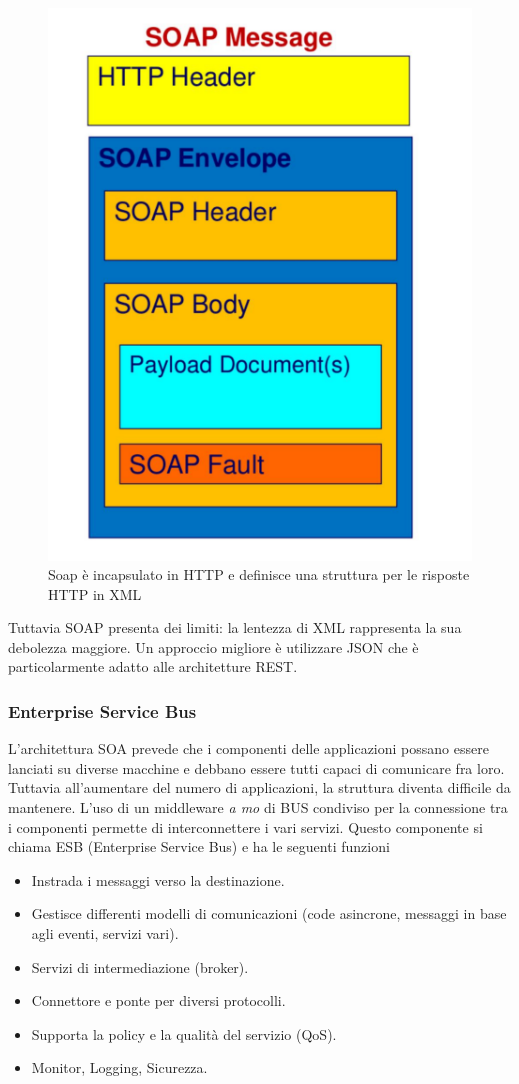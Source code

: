 \documentclass{article}
\begin{document}
		\begin{figure}[ht]
		    \centering
		    \includegraphics[width=0.3\linewidth]{SAC_A2_soapMessage.png}
		    \caption{Soap è incapsulato in HTTP e definisce una struttura per le risposte HTTP in XML}
		\end{figure}
		
		Tuttavia SOAP presenta dei limiti: la lentezza di XML rappresenta la sua debolezza maggiore. Un approccio migliore è utilizzare JSON che è particolarmente adatto alle architetture REST.
		
		\subsubsection{Enterprise Service Bus}
		L'architettura SOA prevede che i componenti delle applicazioni possano essere lanciati su diverse macchine e debbano essere tutti capaci di comunicare fra loro. Tuttavia all'aumentare del numero di applicazioni, la struttura diventa difficile da mantenere.
		\newline
		L'uso di un middleware \textit{a mo} di BUS condiviso per la connessione tra i componenti permette di interconnettere i vari servizi. Questo componente si chiama ESB (Enterprise Service Bus) e ha le seguenti funzioni
		\begin{itemize}
		    \item Instrada i messaggi verso la destinazione.
		    \item Gestisce differenti modelli di comunicazioni (code asincrone, messaggi in base agli eventi, servizi vari).
		    \item Servizi di intermediazione (broker).
		    \item Connettore e ponte per diversi protocolli.
		    \item Supporta la policy e la qualità del servizio (QoS).
		    \item Monitor, Logging, Sicurezza.
		\end{itemize}
		
\end{document}
